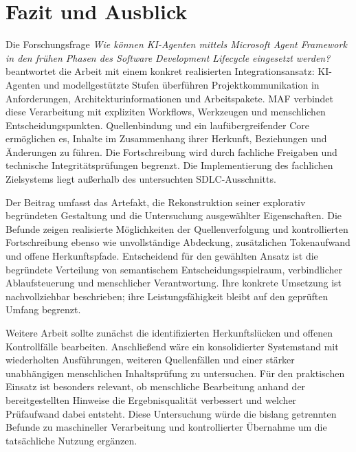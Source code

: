 
\section{Fazit und Ausblick}
\label{sec:fazit-ausblick}

Die Forschungsfrage \emph{Wie können KI-Agenten mittels Microsoft Agent
Framework in den frühen Phasen des Software Development Lifecycle
eingesetzt werden?} beantwortet die Arbeit mit einem konkret
realisierten Integrationsansatz: KI-Agenten und modellgestützte Stufen
überführen Projektkommunikation in Anforderungen, Architekturinformationen
und Arbeitspakete. MAF verbindet diese Verarbeitung mit expliziten
Workflows, Werkzeugen und menschlichen Entscheidungspunkten. Quellenbindung
und ein laufübergreifender Core ermöglichen es, Inhalte im Zusammenhang
ihrer Herkunft, Beziehungen und Änderungen zu führen. Die Fortschreibung
wird durch fachliche Freigaben und technische Integritätsprüfungen
begrenzt. Die Implementierung des fachlichen Zielsystems liegt außerhalb
des untersuchten SDLC-Ausschnitts.

Der Beitrag umfasst das Artefakt, die Rekonstruktion seiner explorativ
begründeten Gestaltung und die Untersuchung ausgewählter Eigenschaften.
Die Befunde zeigen realisierte Möglichkeiten der Quellenverfolgung und
kontrollierten Fortschreibung ebenso wie unvollständige Abdeckung,
zusätzlichen Tokenaufwand und offene Herkunftspfade. Entscheidend für den
gewählten Ansatz ist die begründete Verteilung von semantischem
Entscheidungsspielraum, verbindlicher Ablaufsteuerung und menschlicher
Verantwortung. Ihre konkrete Umsetzung ist nachvollziehbar beschrieben;
ihre Leistungsfähigkeit bleibt auf den geprüften Umfang begrenzt.

Weitere Arbeit sollte zunächst die identifizierten Herkunftslücken und
offenen Kontrollfälle bearbeiten. Anschließend wäre ein konsolidierter
Systemstand mit wiederholten Ausführungen, weiteren Quellenfällen und
einer stärker unabhängigen menschlichen Inhaltsprüfung zu untersuchen.
Für den praktischen Einsatz ist besonders relevant, ob menschliche
Bearbeitung anhand der bereitgestellten Hinweise die Ergebnisqualität
verbessert und welcher Prüfaufwand dabei entsteht. Diese Untersuchung
würde die bislang getrennten Befunde zu maschineller Verarbeitung und
kontrollierter Übernahme um die tatsächliche Nutzung ergänzen.
